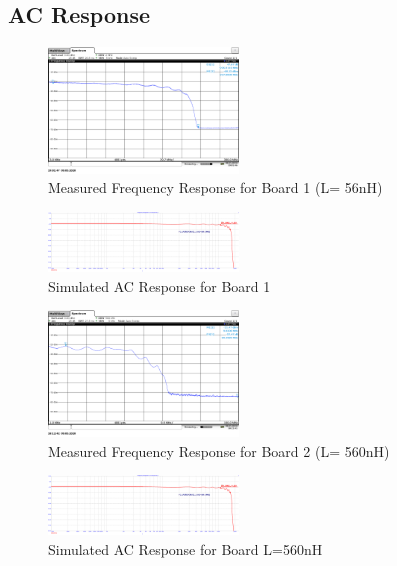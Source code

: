 \documentclass[journal]{IEEEtran}
\begin{document}
\subsection{AC Response}\label{ACMeasResults}

\begin{figure}[htb]
\centering
\includegraphics[width=0.45\textwidth]{MeasuredACResponseB1.png}
\caption{Measured Frequency Response for Board 1 (L= 56nH)}
\label{fig:MeasACBoard1}
\end{figure}

\begin{figure}[htb]
\centering
\includegraphics[width=0.45\textwidth]{ACResponseB1}
\caption{Simulated AC Response for Board 1}
\label{fig:simACBoard1}
\end{figure}



\begin{figure}[htb]
\centering
\includegraphics[width=0.45\textwidth]{MeasuredACResponseB2.png}
\caption{Measured Frequency Response for Board 2 (L= 560nH)}
\label{fig:MeasACBoard2}
\end{figure}

\begin{figure}[htb]
\centering
\includegraphics[width=0.45\textwidth]{ACResponseB1}
\caption{Simulated AC Response for Board L=560nH}
\label{fig:simACBoard2}
\end{figure}
\end{document}

